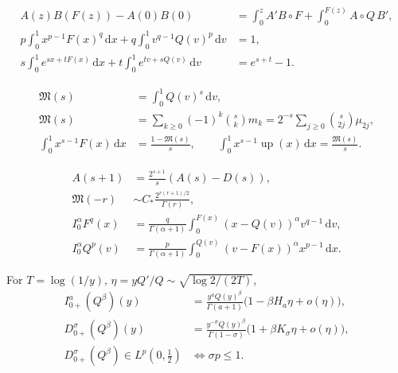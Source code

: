 \documentclass[11pt,oneside]{article}
\theoremstyle{definition}
\newcommand{\F}{F}
\newcommand{\Q}{Q}
\newcommand{\upf}{\operatorname{up}}
\newcommand{\M}{\mathfrak M}
\newcommand{\dd}{\,\mathrm d}
\begin{document}
\begin{resultbox}
\begin{align*}
 A(z)B(\F(z))-A(0)B(0)
 &=\int_0^zA'B\circ\F
 +\int_0^{\F(z)}A\circ\Q\,B',\\
 p\int_0^1x^{p-1}\F(x)^q\dd x
 +q\int_0^1v^{q-1}\Q(v)^p\dd v&=1,\\
 s\int_0^1e^{sx+t\F(x)}\dd x
 +t\int_0^1e^{tv+s\Q(v)}\dd v&=e^{s+t}-1.
\end{align*}
\end{resultbox}

\begin{resultbox}
\begin{align*}
 \M(s)&=\int_0^1\Q(v)^s\dd v,\\
 \M(s)&=\sum_{k\ge0}(-1)^k\binom skm_k
 =2^{-s}\sum_{j\ge0}\binom{s}{2j}\mu_{2j},\\
 \int_0^1x^{s-1}\F(x)\dd x&=\frac{1-\M(s)}s,\qquad
 \int_0^1x^{s-1}\upf(x)\dd x=\frac{\M(s)}s.
\end{align*}
\end{resultbox}

\begin{resultbox}
\begin{align*}
 A(s+1)&=\frac{2^{s+1}}s(A(s)-D(s)),\\
 \M(-r)&\sim C_*\frac{2^{r(r+1)/2}}{\Gamma(r)},\\
 I_0^\alpha\F^q(x)
 &=\frac{q}{\Gamma(\alpha+1)}
 \int_0^{\F(x)}(x-\Q(v))^\alpha v^{q-1}\dd v,\\
 I_0^\alpha\Q^p(v)
 &=\frac{p}{\Gamma(\alpha+1)}
 \int_0^{\Q(v)}(v-\F(x))^\alpha x^{p-1}\dd x.
\end{align*}
\end{resultbox}

\begin{resultbox}
For \(T=\log(1/y)\), \(\eta=y\Q'/\Q\sim\sqrt{\log2/(2T)}\),
\begin{align*}
 I_{0+}^{a}(\Q^\beta)(y)
 &=\frac{y^a\Q(y)^\beta}{\Gamma(a+1)}
   \bigl(1-\beta H_a\eta+o(\eta)\bigr),\\
 D_{0+}^{\sigma}(\Q^\beta)(y)
 &=\frac{y^{-\sigma}\Q(y)^\beta}{\Gamma(1-\sigma)}
   \bigl(1+\beta K_\sigma\eta+o(\eta)\bigr),\\
 D_{0+}^{\sigma}(\Q^\beta)\in L^p(0,\tfrac12)
 &\Longleftrightarrow \sigma p\le1.
\end{align*}
\end{resultbox}
\end{document}
